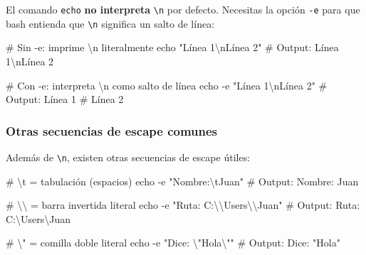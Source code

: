 \documentclass[
  spanish,
  12pt,
  letterpaper,
  DIV=11,
  numbers=noendperiod]{scrreprt}
\newenvironment{Shaded}{\begin{snugshade}}{\end{snugshade}}
\newcommand{\AttributeTok}[1]{\textcolor[rgb]{0.40,0.45,0.13}{#1}}
\newcommand{\BuiltInTok}[1]{\textcolor[rgb]{0.00,0.23,0.31}{#1}}
\newcommand{\CommentTok}[1]{\textcolor[rgb]{0.37,0.37,0.37}{#1}}
\newcommand{\DataTypeTok}[1]{\textcolor[rgb]{0.68,0.00,0.00}{#1}}
\newcommand{\StringTok}[1]{\textcolor[rgb]{0.13,0.47,0.30}{#1}}
\begin{document}
\begin{tcolorbox}[enhanced jigsaw, arc=.35mm, bottomrule=.15mm, bottomtitle=1mm, breakable, colback=white, colbacktitle=quarto-callout-important-color!10!white, colframe=quarto-callout-important-color-frame, coltitle=black, left=2mm, leftrule=.75mm, opacityback=0, opacitybacktitle=0.6, rightrule=.15mm, title={¿Por qué necesitas \texttt{-e} en \texttt{echo} al usar
\texttt{\textbackslash{}n}?}, titlerule=0mm, toprule=.15mm, toptitle=1mm]

El comando \texttt{echo} \textbf{no interpreta}
\texttt{\textbackslash{}n} por defecto. Necesitas la opción \texttt{-e}
para que bash entienda que \texttt{\textbackslash{}n} significa un salto
de línea:

\begin{Shaded}
\begin{Highlighting}[]
\CommentTok{\# Sin {-}e: imprime \textbackslash{}n literalmente}
\BuiltInTok{echo} \StringTok{"Línea 1\textbackslash{}nLínea 2"}
\CommentTok{\# Output: Línea 1\textbackslash{}nLínea 2}

\CommentTok{\# Con {-}e: interpreta \textbackslash{}n como salto de línea}
\BuiltInTok{echo} \AttributeTok{{-}e} \StringTok{"Línea 1\textbackslash{}nLínea 2"}
\CommentTok{\# Output: Línea 1}
\CommentTok{\#         Línea 2}
\end{Highlighting}
\end{Shaded}

\end{tcolorbox}

\subsubsection{Otras secuencias de escape comunes
📌}\label{otras-secuencias-de-escape-comunes}

Además de \texttt{\textbackslash{}n}, existen otras secuencias de escape
útiles:

\begin{Shaded}
\begin{Highlighting}[]
\CommentTok{\# \textbackslash{}t = tabulación (espacios)}
\BuiltInTok{echo} \AttributeTok{{-}e} \StringTok{"Nombre:\textbackslash{}tJuan"}
\CommentTok{\# Output: Nombre:    Juan}

\CommentTok{\# \textbackslash{}\textbackslash{} = barra invertida literal}
\BuiltInTok{echo} \AttributeTok{{-}e} \StringTok{"Ruta: C:}\DataTypeTok{\textbackslash{}\textbackslash{}}\StringTok{Users}\DataTypeTok{\textbackslash{}\textbackslash{}}\StringTok{Juan"}
\CommentTok{\# Output: Ruta: C:\textbackslash{}Users\textbackslash{}Juan}

\CommentTok{\# \textbackslash{}" = comilla doble literal}
\BuiltInTok{echo} \AttributeTok{{-}e} \StringTok{"Dice: }\DataTypeTok{\textbackslash{}"}\StringTok{Hola}\DataTypeTok{\textbackslash{}"}\StringTok{"}
\CommentTok{\# Output: Dice: "Hola"}
\end{Highlighting}
\end{Shaded}
\end{document}
